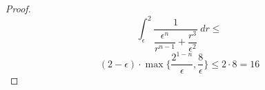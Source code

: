 \documentclass[12pt]{article}
\begin{document}
\begin{proof}
$$    \int_\epsilon^2 \frac{1}{\dfrac{\epsilon^n}{r^{n-1}} + \dfrac{r^3}{\epsilon^2}}\ dr \le
  $$
  $$
    (2 - \epsilon) \cdot \max\{ \frac{2^{1-n}}{\epsilon}, \frac{8}{\epsilon} \} \le
    2 \cdot 8 =
    16
  $$
\end{proof}
\end{document}
